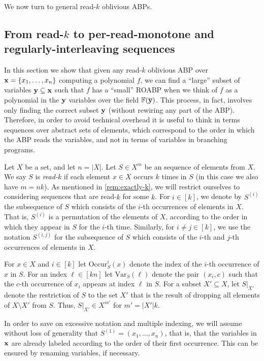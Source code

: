 \documentclass[11pt]{article}
\newcommand{\occur}[3]{\mathrm{Occur}_{#1}^{#2}({#3})}
\newcommand{\var}[2]{\mathrm{Var}_{#1}({#2})}
\begin{document}
We now turn to general read-$k$ oblivious ABPs.

\subsection{From read-$k$ to per-read-monotone and regularly-interleaving sequences}

In this section we show that given any read-$k$ oblivious ABP over $\mathbf{x}=\{x_1, \ldots, x_n\}$ computing a polynomial $f$, we can find a ``large'' subset of variables $\mathbf{y} \subseteq \mathbf{x}$ such that $f$ has a ``small'' ROABP when we think of $f$ as a polynomial in the $\mathbf{y}$ variables over the field $\F(\overline{\vecy})$. This process, in fact, involves only finding the correct subset $\mathbf{y}$ (without rewiring any part of the ABP).  Therefore, in order to avoid technical overhead it is useful to think in terms sequences over abstract sets of elements, which correspond to the order in which the ABP reads the variables, and not in terms of variables in branching programs.

Let $X$ be a set, and let $n=|X|$.  Let $S \in X^{m}$ be an sequence of elements from $X$.  We say $S$ is \emph{read-$k$} if each element $x \in X$ occurs $k$ times in $S$ (in this case we also have $m=nk$). 
As mentioned in \autoref{rem:exactly-k}, we will restrict ourselves to considering sequences that are read-$k$ for some $k$.
For $i \in [k]$, we denote by $S^{(i)}$ the subsequence of $S$ which consists of the $i$-th occurrences of elements in $X$. That is, $S^{(i)}$ is a permutation of the elements of $X$, according to the order in which they appear in $S$ for the $i$-th time. Similarly, for $i\neq j \in [k]$, we use the notation $S^{(i,j)}$ for the subsequence of $S$ which consists of the $i$-th and $j$-th occurrences of elements in $X$.

For $x \in X$ and $i \in [k]$ let $\occur{S}{i}{x}$ denote the index of the $i$-th occurrence of $x$ in $S$.  For an index $\ell \in [kn]$ let $\var{S}{\ell}$ denote the pair $(x_i,c)$ such that the $c$-th occurrence of $x_i$ appears at index $\ell$ in $S$.   For a subset $X' \subseteq X$, let $S|_{X'}$ denote the restriction of $S$ to the set $X'$ that is the result of dropping all elements of $X \setminus X'$ from $S$. Thus, $S|_{X'} \in X^{m'}$ for $m'=|X'|k$.

In order to save on excessive notation and multiple indexing, we will assume without loss of generality that $S^{(1)} = (x_1, \ldots, x_n)$, that is, that the variables in $\mathbf{x}$ are already labeled according to the order of their first occurrence. This can be ensured by renaming variables, if necessary. 
\end{document}
